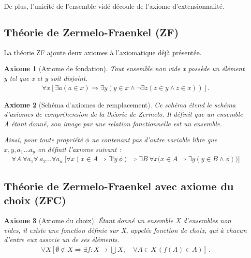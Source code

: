\documentclass[10pt,a4paper]{article}
\newtheorem{axiom}{Axiome}[section]
\begin{document}
{De plus, l'unicité de l'ensemble vidé découle de l'axiome d'extensionnalité.

\subsection{Théorie de Zermelo-Fraenkel (ZF)}

La théorie ZF ajoute deux axiomes à l'axiomatique déjà présentée.

\begin{axiom}[Axiome de fondation] Tout ensemble non vide x possède un élément y tel que x et y soit disjoint.
\begin{align}
\forall x [ \exists a ( a \in x) \Rightarrow \exists y ( y \in x \land \lnot \exists z (z \in y \land z \in x))]. 
\end{align}
\end{axiom}

\begin{axiom}[Schéma d'axiomes de remplacement] Ce schéma étend le schéma d'axiomes de compréhension de la théorie de Zermelo. Il définit que un ensemble A étant donné, son image par une relation fonctionnelle est un ensemble.

Ainsi, pour toute propriété $\phi$ ne contenant pas d'autre variable libre que $x, y, a_1 \ldots a_p$ on définit l'axiome suivant :
\begin{align}
\forall A \ \forall a_1 \forall \ a_2 \ldots \forall a_n \ 
\bigl[ \forall x ( x\in A \Rightarrow \exists! y\,\phi ) \Rightarrow \exists B \ \forall x \bigl(x\in A \Rightarrow \exists y (y\in B \land \phi) \bigr) \bigr]
\end{align}
\end{axiom}

\subsection{Théorie de Zermelo-Fraenkel avec axiome du choix (ZFC)}

\begin{axiom}[Axiome du choix] Étant donné un ensemble X d'ensembles non vides, il existe une fonction définie sur X, appelée fonction de choix, qui à chacun d'entre eux associe un de ses éléments.
\begin{align}
\forall X \left[ \emptyset \notin X \Rightarrow \exists f: X \rightarrow \bigcup X, \quad \forall A \in X \, ( f(A) \in A ) \right] \,. 
\end{align}
\end{axiom}

}
\end{document}
